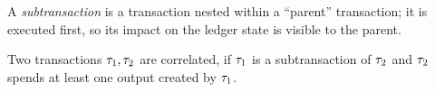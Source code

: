 \begin{definition} \label{def:subtransaction}
    A \emph{subtransaction} is a transaction nested within a ``parent''
    transaction; it is executed first, so its impact on the ledger state is
    visible to the parent.
\end{definition}

\begin{definition} \label{def:correlated_tx}
    Two transactions $\tau_1, \tau_2$ are correlated, if $\tau_1$ is a
    subtransaction of $\tau_2$ and $\tau_2$ spends at least one output created by
    $\tau_1$.
\end{definition}
